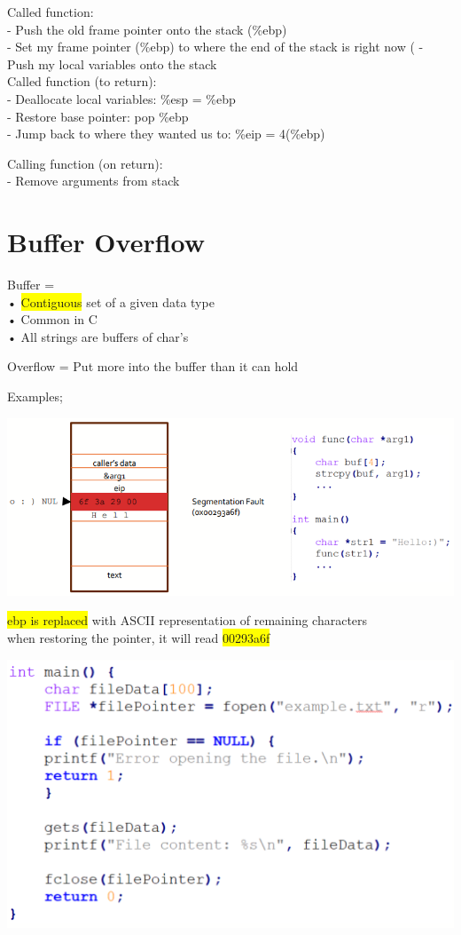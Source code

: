 \documentclass[]{project_plan}
\begin{document}
Called function:\\
- Push the old frame pointer onto the stack (\%ebp)\\
- Set my frame pointer (\%ebp) to where the end of the stack is right now (%
- Push my local variables onto the stack\\

Called function (to return):\\
- Deallocate local variables: \%esp = \%ebp\\
- Restore base pointer: pop \%ebp\\
- Jump back to where they wanted us to: \%eip = 4(\%ebp)

Calling function (on return):\\
- Remove arguments from stack

\section{Buffer Overflow}

Buffer =\\
• \colorbox{yellow}{Contiguous} set of a given data type\\
• Common in C\\
• All strings are buffers of char’s

Overflow = Put more into the buffer than it can hold

Examples;

\includegraphics[width=.6\linewidth]{lec6 buffers eg1.png}

\colorbox{yellow}{ebp is replaced} with ASCII representation of remaining characters\\
when restoring the pointer, it will read \colorbox{yellow}{00293a6f}

\includegraphics[width=.6\linewidth]{lec6 buffers eg2.png}
\end{document}
